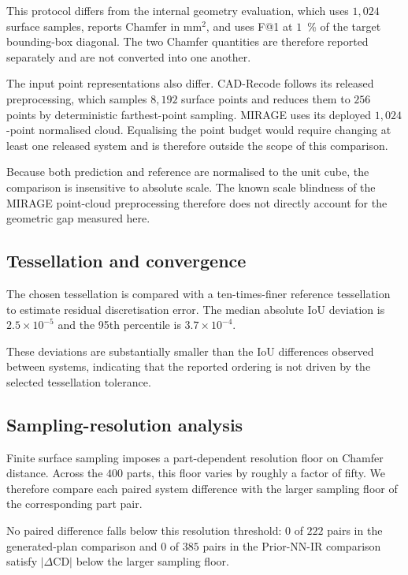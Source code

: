 \documentclass[preprint,12pt]{elsarticle}
\begin{document}
This protocol differs from the internal geometry evaluation, which uses $1{,}024$ surface samples, reports Chamfer in mm$^2$, and uses F@1 at $1$~\% of the target bounding-box diagonal. The two Chamfer quantities are therefore reported separately and are not converted into one another.

The input point representations also differ. CAD-Recode follows its released preprocessing, which samples $8{,}192$ surface points and reduces them to $256$ points by deterministic farthest-point sampling. MIRAGE uses its deployed $1{,}024$-point normalised cloud. Equalising the point budget would require changing at least one released system and is therefore outside the scope of this comparison.

Because both prediction and reference are normalised to the unit cube, the comparison is insensitive to absolute scale. The known scale blindness of the MIRAGE point-cloud preprocessing therefore does not directly account for the geometric gap measured here.

\subsection{Tessellation and convergence}
\label{app:tessellation}

The chosen tessellation is compared with a ten-times-finer reference tessellation to estimate residual discretisation error. The median absolute IoU deviation is $2.5\times10^{-5}$ and the 95th percentile is $3.7\times10^{-4}$.

These deviations are substantially smaller than the IoU differences observed between systems, indicating that the reported ordering is not driven by the selected tessellation tolerance.

\subsection{Sampling-resolution analysis}
\label{app:sampling_floor}

Finite surface sampling imposes a part-dependent resolution floor on Chamfer distance. Across the $400$ parts, this floor varies by roughly a factor of fifty. We therefore compare each paired system difference with the larger sampling floor of the corresponding part pair.

No paired difference falls below this resolution threshold: $0$ of $222$ pairs in the generated-plan comparison and $0$ of $385$ pairs in the Prior-NN-IR comparison satisfy $|\Delta\mathrm{CD}|$ below the larger sampling floor.
\end{document}
